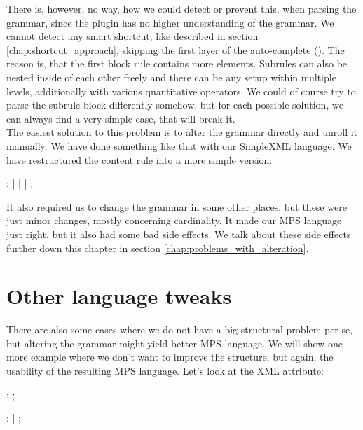 There is, however, no way, how we could detect or prevent this, when parsing the grammar, since the plugin has no higher understanding of the grammar.
We cannot detect any smart shortcut, like described in section \ref{chap:shortcut_approach}, skipping the first layer of the auto-complete ().
The reason is, that the first block rule contains more elements.
Subrules can also be nested inside of each other freely and there can be any setup within multiple levels, additionally with various quantitative operators.
We could of course try to parse the subrule block differently somehow, but for each possible solution, we can always find a very simple case, that will break it.
\\

The easiest solution to this problem is to alter the grammar directly and unroll it manually.
We have done something like that with our SimpleXML language.
We have restructured the content rule into a more simple version:

\begin{antlr}
	    :   
	           |   
	           |   
	           |   
	           ;
\end{antlr}

It also required us to change the grammar in some other places, but these were just minor changes, mostly concerning cardinality.
It made our MPS language just right, but it also had some bad side effects.
We talk about these side effects further down this chapter in section \ref{chap:problems_with_alteration}.

\section{Other language tweaks}

There are also some cases where we do not have a big structural problem per se, but altering the grammar might yield better MPS language.
We will show one more example where we don't want to improve the structure, but again, the usability of the resulting MPS language.
Let's look at the XML attribute:

\begin{antlr}
	   :    \literal{=}  ;

	      :    \regex{~["]*} 
	            |    \regex{~[']*} 
	            ;
\end{antlr}

